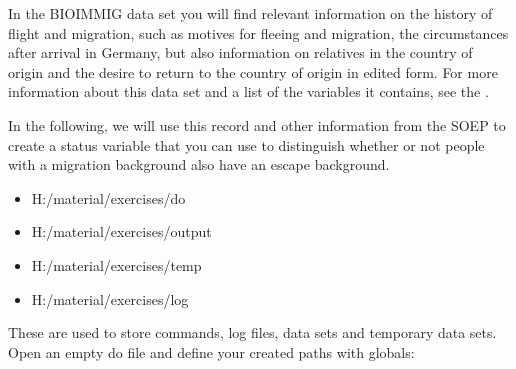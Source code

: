 \documentclass[letterpaper,10pt,openany,onesideH,english]{sphinxmanual}
\begin{document}
In the BIOIMMIG data set you will find relevant information on the history of flight and migration, such as motives for fleeing and migration, the circumstances after arrival in Germany, but also information on relatives in the country of origin and the desire to return to the country of origin in edited form. For more information about this data set and a list of the variables it contains, see the
.

In the following, we will use this record and other information from the SOEP to create a status variable that you can use to distinguish whether or not people with a migration background also have an escape background.


\begin{figure}[H]
\centering

\noindent{}
\end{figure}

\begin{itemize}
\item {} 
H:/material/exercises/do

\item {} 
H:/material/exercises/output

\item {} 
H:/material/exercises/temp

\item {} 
H:/material/exercises/log

\end{itemize}

These are used to store commands, log files, data sets and temporary data sets.
Open an empty do file and define your created paths with globals:
\end{document}
